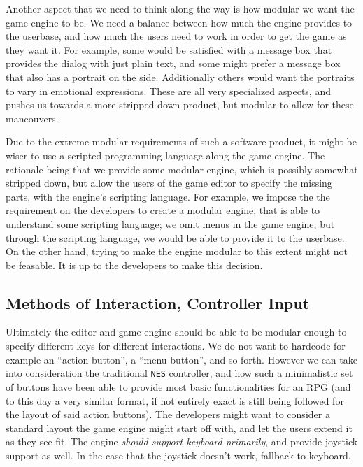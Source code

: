 Another aspect that we need to think along the way is how modular we want
the game engine to be. We need a balance between how much the engine provides
to the userbase, and how much the users need to work in order to get the game
as they want it. For example, some would be satisfied with a message box that
provides the dialog with just plain text, and some might prefer a message box
that also has a portrait on the side. Additionally others would want the
portraits to vary in emotional expressions. These are all very specialized
aspects, and pushes us towards a more stripped down product, but modular to
allow for these maneouvers.

Due to the extreme modular requirements of such a software product, it might be
wiser to use a scripted programming language along the game engine. The rationale
being that we provide some modular engine, which is possibly somewhat stripped
down, but allow the users of the game editor to specify the missing parts, with
the engine's scripting language. For example, we impose the the requirement on
the developers to create a modular engine, that is able to understand some
scripting language; we omit menus in the game engine, but through the scripting
language, we would be able to provide it to the userbase. On the other hand,
trying to make the engine modular to this extent might not be feasable. It is up
to the developers to make this decision.

\subsection{Methods of Interaction, Controller Input}

Ultimately the editor and game engine should be able to be modular enough to
specify different keys for different interactions. We do not want to hardcode
for example an ``action button'', a ``menu button'', and so forth. However we
can take into consideration the traditional \texttt{NES} controller, and how
such a minimalistic set of buttons have been able to provide most basic
functionalities for an RPG (and to this day a very similar format, if not
entirely exact is still being followed for the layout of said action buttons).
The developers might want to consider a standard layout the game engine might
start off with, and let the users extend it as they see fit. The engine
\textit{should support keyboard primarily}, and provide joystick support as
well. In the case that the joystick doesn't work, fallback to keyboard.

